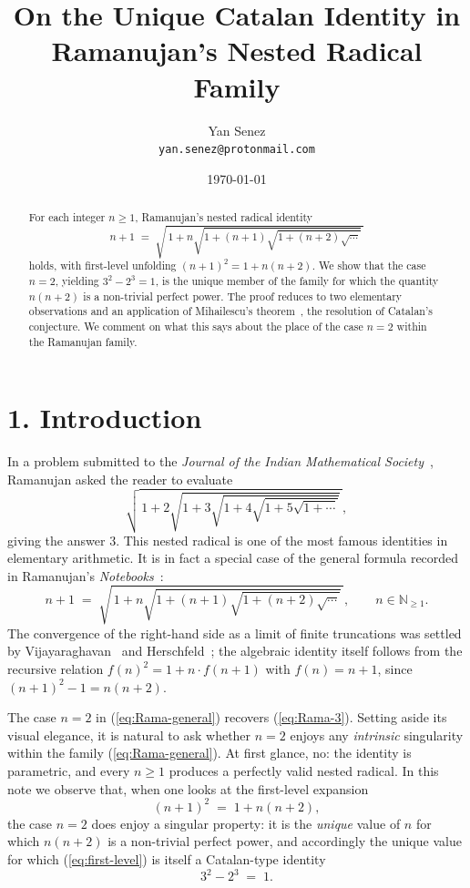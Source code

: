 \documentclass[12pt,a4paper]{article}
\title{\textbf{On the Unique Catalan Identity in Ramanujan's Nested Radical Family}}
\author{Yan Senez\\\texttt{yan.senez@protonmail.com}}
\date{\today}
\begin{document}
\maketitle

\begin{abstract}
For each integer $n \geq 1$, Ramanujan's nested radical identity
\[
n + 1 \;=\; \sqrt{\,1 + n\sqrt{1 + (n+1)\sqrt{1 + (n+2)\sqrt{\cdots}}}\,}
\]
holds, with first-level unfolding $(n+1)^2 = 1 + n(n+2)$.  We show
that the case $n = 2$, yielding $3^2 - 2^3 = 1$, is the unique member
of the family for which the quantity $n(n+2)$ is a non-trivial perfect
power.  The proof reduces to two elementary observations and an
application of Mihailescu's theorem~\cite{Mihailescu2004}, the
resolution of Catalan's conjecture.  We comment on what this says
about the place of the case $n=2$ within the Ramanujan family.
\end{abstract}

\section*{1. Introduction}

In a problem submitted to the \emph{Journal of the Indian Mathematical
Society}~\cite{Ramanujan1911}, Ramanujan asked the reader to evaluate
\begin{equation}
\sqrt{\,1 + 2\sqrt{1 + 3\sqrt{1 + 4\sqrt{1 + 5\sqrt{1 + \cdots}}}}\,},
\label{eq:Rama-3}
\end{equation}
giving the answer $3$.  This nested radical is one of the most famous
identities in elementary arithmetic.  It is in fact a special case of
the general formula recorded in Ramanujan's
\emph{Notebooks}~\cite[Ch.~12]{Berndt1985}:
\begin{equation}
n + 1 \;=\; \sqrt{\,1 + n\sqrt{1 + (n+1)\sqrt{1 + (n+2)\sqrt{\cdots}}}\,},
\qquad n \in \mathbb{N}_{\geq 1}.
\label{eq:Rama-general}
\end{equation}
The convergence of the right-hand side as a limit of finite truncations
was settled by Vijayaraghavan~\cite{Vijayaraghavan1929} and
Herschfeld~\cite{Herschfeld1935}; the algebraic identity itself follows
from the recursive relation $f(n)^2 = 1 + n \cdot f(n+1)$ with $f(n) = n+1$,
since $(n+1)^2 - 1 = n(n+2)$.

The case $n = 2$ in (\ref{eq:Rama-general}) recovers (\ref{eq:Rama-3}).
Setting aside its visual elegance, it is natural to ask whether $n = 2$
enjoys any \emph{intrinsic} singularity within the family
(\ref{eq:Rama-general}).  At first glance, no: the identity is
parametric, and every $n \geq 1$ produces a perfectly valid nested
radical.  In this note we observe that, when one looks at the
first-level expansion
\begin{equation}
(n+1)^2 \;=\; 1 + n(n+2),
\label{eq:first-level}
\end{equation}
the case $n = 2$ does enjoy a singular property: it is the
\emph{unique} value of $n$ for which $n(n+2)$ is a non-trivial perfect
power, and accordingly the unique value for which (\ref{eq:first-level})
is itself a Catalan-type identity
\begin{equation}
3^2 - 2^3 \;=\; 1.
\label{eq:Catalan-3-2}
\end{equation}
\end{document}
